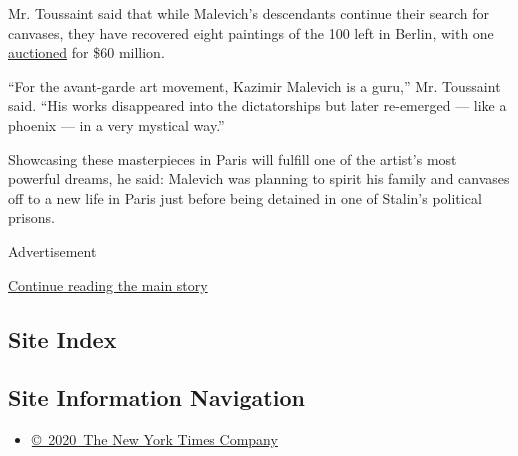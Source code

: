Mr. Toussaint said that while Malevich's descendants continue their
search for canvases, they have recovered eight paintings of the 100 left
in Berlin, with one
\href{http://www.nytimes3xbfgragh.onion/2008/11/06/arts/06iht-melik5.html}{auctioned}
for \$60 million.

``For the avant-garde art movement, Kazimir Malevich is a guru,'' Mr.
Toussaint said. ``His works disappeared into the dictatorships but later
re-emerged --- like a phoenix --- in a very mystical way.''

Showcasing these masterpieces in Paris will fulfill one of the artist's
most powerful dreams, he said: Malevich was planning to spirit his
family and canvases off to a new life in Paris just before being
detained in one of Stalin's political prisons.

Advertisement

\protect\hyperlink{after-bottom}{Continue reading the main story}

\hypertarget{site-index}{%
\subsection{Site Index}\label{site-index}}

\hypertarget{site-information-navigation}{%
\subsection{Site Information
Navigation}\label{site-information-navigation}}

\begin{itemize}
\tightlist
\item
  \href{https://help.nytimes3xbfgragh.onion/hc/en-us/articles/115014792127-Copyright-notice}{©~2020~The
  New York Times Company}
\end{itemize}

